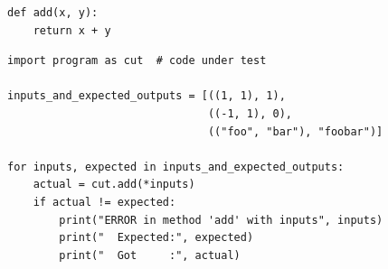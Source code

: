 
\begin{frame}[fragile]
%
\begin{codebox}[program.py]
\begin{verbatim}
def add(x, y):
    return x + y
\end{verbatim}
\end{codebox}
%
\begin{codebox}[test.py]
\begin{verbatim}
import program as cut  # code under test

inputs_and_expected_outputs = [((1, 1), 1), 
                               ((-1, 1), 0),
                               (("foo", "bar"), "foobar")]

for inputs, expected in inputs_and_expected_outputs:
    actual = cut.add(*inputs)
    if actual != expected:
        print("ERROR in method 'add' with inputs", inputs)
        print("  Expected:", expected)
        print("  Got     :", actual)
\end{verbatim}
\end{codebox}
%
\end{frame}


